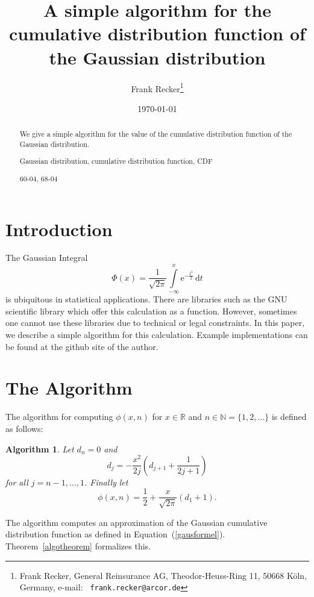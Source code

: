 \documentclass{article}
\title{A simple algorithm for the cumulative distribution function of
the Gaussian distribution}
\author{Frank Recker\thanks{Frank Recker, General Reinsurance AG,
Theodor-Heuss-Ring 11, 50668 Köln, Germany, e-mail: {\tt
frank.recker@arcor.de}}}
\date{\today}
\newtheorem{algorithm}{Algorithm}
\newcommand\Nset{\mathbb N}
\newcommand\intd{{\mbox{d}}}
\begin{document}
\maketitle
\begin{abstract}
\noindent We give a simple algorithm for the value of
the cumulative distribution function of the Gaussian distribution.

 Gaussian distribution, cumulative distribution
function, CDF

 60-04, 68-04
\end{abstract}
\tableofcontents

\section{Introduction}
The Gaussian Integral
\begin{equation}\Phi(x)=\frac{1}{\sqrt{2\pi}}\int\limits_{-\infty}^x\mbox{e}^{-\frac{t^2}{2}}\,\intd t\label{gausformel}\end{equation}
is ubiquitous in statistical applications. There are libraries such as
the GNU scientific library \cite{gnuscientific} which offer this
calculation as a function. However, sometimes one cannot use these
libraries due to technical or legal constraints. In this paper, we
describe a simple algorithm for this calculation. Example
implementations can be found at the github site \cite{github} of the
author.

\section{The Algorithm}
The algorithm for computing $\phi(x,n)$ for $x\in{\mathbb R}$ and
$n\in\Nset=\{1,2,\dots\}$ is defined as follows:
\begin{algorithm}\label{mainalgo}
  Let $d_n=0$ and
  \begin{equation*}d_j=-\frac{x^2}{2j}\left(d_{j+1}
     +\frac{1}{2j+1}\right)\end{equation*}
  for all $j=n-1,\dots,1$. Finally let
  \begin{equation*}\phi(x,n)=\frac{1}{2}
     +\frac{x}{\sqrt{2\pi}}\left(d_1+1\right).\end{equation*}
\end{algorithm}

The algorithm computes an approximation of the Gaussian cumulative
distribution function as defined in
Equation~(\ref{gausformel}). Theorem~\ref{algotheorem} formalizes
this.
\end{document}
